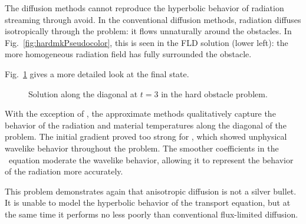 The diffusion methods cannot reproduce the hyperbolic behavior of radiation
streaming through avoid. In the conventional diffusion methods, radiation
diffuses isotropically through the problem: it flows unnaturally around the
obstacles. In Fig.~\ref{fig:hardmkPseudocolor}, this is seen in the FLD solution
(lower left): the more homogeneous radiation field has fully surrounded the
obstacle.

Fig.~\ref{fig:hardmkDiag} gives a more detailed look at the final state.
%
\begin{figure}[htb]
  \centering
  \caption{Solution along the diagonal at $t=3$ in the hard obstacle problem.}
  \label{fig:hardmkDiag}
\end{figure}
%
With the exception of \Pone, the approximate methods qualitatively
capture the behavior of the radiation and material temperatures along the
diagonal of the problem. The initial gradient proved too strong for \Pone, which
showed unphysical wavelike behavior throughout the problem. The smoother
coefficients in the \APone\ equation moderate the wavelike behavior, allowing it
to represent the behavior of the radiation more accurately.

This problem demonstrates again that anisotropic diffusion is not a silver
bullet. It is unable to model the hyperbolic behavior of the transport equation,
but at the same time it performs no less poorly than conventional flux-limited
diffusion.

%  

